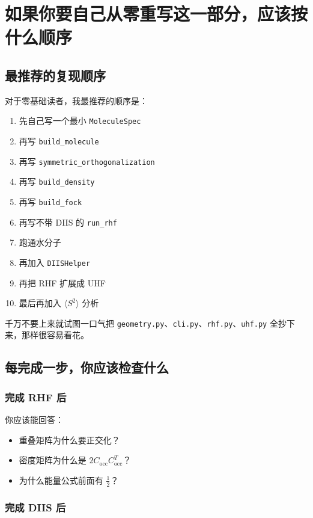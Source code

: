 \documentclass[UTF8,11pt,fontset=fandol]{ctexbook}
\begin{document}
\chapter{如果你要自己从零重写这一部分，应该按什么顺序}

\section{最推荐的复现顺序}

对于零基础读者，我最推荐的顺序是：

\begin{enumerate}[label=\arabic*.]
  \item 先自己写一个最小 \texttt{MoleculeSpec}
  \item 再写 \texttt{build\_molecule}
  \item 再写 \texttt{symmetric\_orthogonalization}
  \item 再写 \texttt{build\_density}
  \item 再写 \texttt{build\_fock}
  \item 再写不带 DIIS 的 \texttt{run\_rhf}
  \item 跑通水分子
  \item 再加入 \texttt{DIISHelper}
  \item 再把 RHF 扩展成 UHF
  \item 最后再加入 $\langle S^2\rangle$ 分析
\end{enumerate}

千万不要上来就试图一口气把 \texttt{geometry.py}、\texttt{cli.py}、\texttt{rhf.py}、\texttt{uhf.py} 全抄下来，那样很容易看花。

\section{每完成一步，你应该检查什么}

\subsection*{完成 RHF 后}

你应该能回答：
\begin{itemize}
  \item 重叠矩阵为什么要正交化？
  \item 密度矩阵为什么是 $2C_{\mathrm{occ}}C_{\mathrm{occ}}^T$？
  \item 为什么能量公式前面有 $\frac{1}{2}$？
\end{itemize}

\subsection*{完成 DIIS 后}
\end{document}
